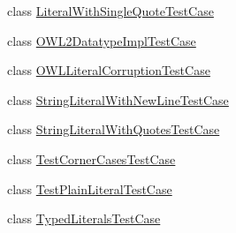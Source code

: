 \begin{DoxyCompactItemize}
\item 
class \hyperlink{classorg_1_1semanticweb_1_1owlapi_1_1api_1_1test_1_1literals_1_1_literal_with_single_quote_test_case}{Literal\-With\-Single\-Quote\-Test\-Case}
\item 
class \hyperlink{classorg_1_1semanticweb_1_1owlapi_1_1api_1_1test_1_1literals_1_1_o_w_l2_datatype_impl_test_case}{O\-W\-L2\-Datatype\-Impl\-Test\-Case}
\item 
class \hyperlink{classorg_1_1semanticweb_1_1owlapi_1_1api_1_1test_1_1literals_1_1_o_w_l_literal_corruption_test_case}{O\-W\-L\-Literal\-Corruption\-Test\-Case}
\item 
class \hyperlink{classorg_1_1semanticweb_1_1owlapi_1_1api_1_1test_1_1literals_1_1_string_literal_with_new_line_test_case}{String\-Literal\-With\-New\-Line\-Test\-Case}
\item 
class \hyperlink{classorg_1_1semanticweb_1_1owlapi_1_1api_1_1test_1_1literals_1_1_string_literal_with_quotes_test_case}{String\-Literal\-With\-Quotes\-Test\-Case}
\item 
class \hyperlink{classorg_1_1semanticweb_1_1owlapi_1_1api_1_1test_1_1literals_1_1_test_corner_cases_test_case}{Test\-Corner\-Cases\-Test\-Case}
\item 
class \hyperlink{classorg_1_1semanticweb_1_1owlapi_1_1api_1_1test_1_1literals_1_1_test_plain_literal_test_case}{Test\-Plain\-Literal\-Test\-Case}
\item 
class \hyperlink{classorg_1_1semanticweb_1_1owlapi_1_1api_1_1test_1_1literals_1_1_typed_literals_test_case}{Typed\-Literals\-Test\-Case}
\end{DoxyCompactItemize}
